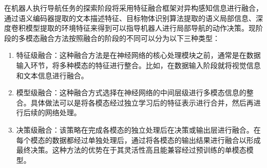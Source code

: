 在机器人执行导航任务的探索阶段将采用特征融合框架对异构感知信息进行融合，通过语义编码器提取的文本描述特征、目标物体识别算法提取的语义局部信息、深度卷积模型提取的环境特征来得到可以指导机器人进行局部导航的动作决策。现阶段的多模态融合方法按照融合的阶段的不同可以分为以下三种类型：
\begin{enumerate}[topsep = 0 pt, itemsep= 0 pt, parsep=0pt, partopsep=0pt, leftmargin=44pt, itemindent=0pt, labelsep=6pt, label=(\arabic*)]
    \item 	特征级融合：这种融合方法是在神经网络的核心处理模块之前，通常是在数据输入环节，将多种模态的特征进行整合。比如，在数据输入阶段就将视觉信息和文本信息进行融合。
    \item	模型级融合：这种融合方式选择在神经网络的中间层级进行多模态信息的整合。具体做法可以是将各模态经过独立学习后的特征表示进行合并，然后再进行后续的网络处理。
    \item	决策级融合：该策略在完成各模态的独立处理后在决策或输出层进行融合。在每个模态的数据都经过单独处理后，通过将各模态的输出结果进行融合以形成最终决策。这种方法的优势在于其灵活性高且能兼容经过预训练的单模态模型。
\end{enumerate}

